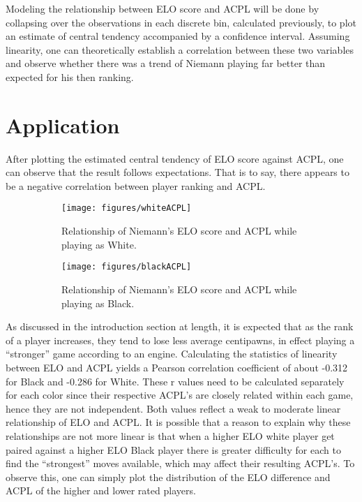 \documentclass[12pt, letterpaper, titlepage]{article}
\begin{document}
Modeling the relationship between ELO score and ACPL will be done by collapsing over the observations in each discrete bin, calculated previously, to plot an estimate of central tendency accompanied by a confidence interval. Assuming linearity, one can theoretically establish a correlation between these two variables and observe whether there was a trend of Niemann playing far better than expected for his then ranking.

\section*{Application}
\label{sec:app}

After plotting the estimated central tendency of ELO score against ACPL, one can observe that the result follows expectations. That is to say, there appears to be a negative correlation between player ranking and ACPL.

\begin{figure}[!htb]
    \centering
    \begin{subfigure}{.5\textwidth}
      \centering
      \texttt{[image: figures/whiteACPL]}
      \caption{Relationship of Niemann's ELO score and ACPL while playing as White.}
      \label{fig:sub1}
    \end{subfigure}
    \begin{subfigure}{.5\textwidth}
      \centering
      \texttt{[image: figures/blackACPL]}
      \caption{Relationship of Niemann's ELO score and ACPL while playing as Black.}
      \label{fig:sub2}
    \end{subfigure}
    \caption{}
    \label{fig:test}
\end{figure}

As discussed in the introduction section at length, it is expected that as the rank of a player increases, they tend to lose less average centipawns, in effect playing a “stronger” game according to an engine. Calculating the statistics of linearity between ELO and ACPL yields a Pearson correlation coefficient of about -0.312 for Black and -0.286 for White. These r values need to be calculated separately for each color since their respective ACPL's are closely related within each game, hence they are not independent. Both values reflect a weak to moderate linear relationship of ELO and ACPL. It is possible that a reason to explain why these relationships are not more linear is that when a higher ELO white player get paired against a higher ELO Black player there is greater difficulty for each to find the “strongest” moves available, which may affect their resulting ACPL's. To observe this, one can simply plot the distribution of the ELO difference and ACPL of the higher and lower rated players.
\end{document}
